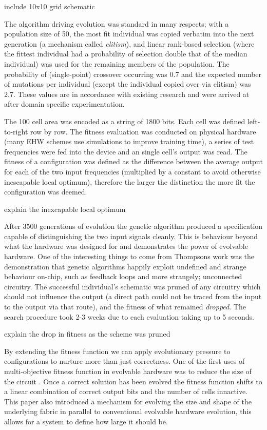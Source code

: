 \todo include 10x10 grid schematic

The algorithm driving evolution was standard in many respects; with a population size of 50,
the most fit individual was copied verbatim into the next generation (a mechanism
called {\em elitism}), and linear rank-based selection (where the fittest
individual had a probability of selection double that of the median individual)
was used for the remaining members of the population. The probability of (single-point)
crossover occurring was 0.7 and the expected number of mutations per individual
(except the individual copied over via elitism) was 2.7. These values are in
accordance with existing research and were arrived at after domain specific
experimentation.

The 100 cell area was encoded as a string of 1800 bits. Each cell was defined
left-to-right row by row. The fitness evaluation was conducted on physical hardware
(many EHW schemes use simulations to improve training time), a series of test frequencies
were fed into the device and an single cell's output was read. The fitness of a configuration
was defined as the difference between the average output for each of the two input frequencies
(multiplied by a constant to avoid otherwise inescapable local optimum), therefore the larger
the distinction the more fit the configuration was deemed.

\todo explain the inexcapable local optimum

After 3500 generations of evolution the genetic algorithm produced a specification
capable of distinguishing the two input signals cleanly. This is behaviour beyond
what the hardware was designed for and demonstrates the power of evolvable hardware. One of the
interesting things to come from Thompsons work was the demonstration that genetic
algorithms happily exploit undefined and strange behaviour on-chip, such as feedback
loops and more strangely; unconnected circuitry. The successful
individual's schematic was pruned of any circuitry which should not influence the
output (a direct path could not be traced from the input to the output via that route),
and the fitness of what remained {\em dropped}. The search procedure took 2-3 weeks
due to each evaluation taking up to 5 seconds.

\todo explain the drop in fitness as the scheme was pruned

By extending the fitness function we can apply evolutionary pressure to configurations
to nurture more than just correctness.
One of the first uses of multi-objective fitness function in evolvable hardware was
to reduce the size of the circuit \cite{785435}. Once a correct solution has been evolved the
fitness function shifts to a linear combination of correct output bits and
the number of cells innactive. This paper also introduced a mechanism for evolving the size
and shape of the underlying fabric in parallel to conventional evolvable hardware
evolution, this allows for a system to define
how large it should be.

